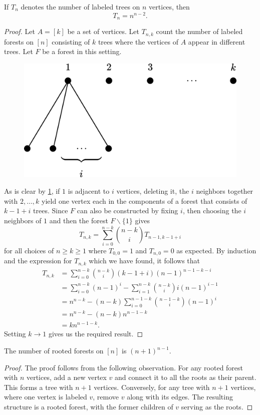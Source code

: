 \begin{theorem}
If $T_n$ denotes the number of labeled trees on $n$ vertices, then
    \[
    T_n = n^{n-2}.
    \]
    \label{t:Cayley's Formula}
\end{theorem}
\begin{proof}
Let $A=[k]$ be a set of vertices. Let $T_{n,k}$ count the number of labeled forests on $[n]$ consisting of $k$ trees where the vertices of $A$ appear in different trees. Let $F$ be a forest in this setting.
\begin{figure}[H]
    \centering
    \includegraphics[width=0.5\linewidth]{Images/Figure30.png}
    \caption{}
    \label{f:CTProof}
\end{figure}
As is clear by \cref{f:CTProof}, if $1$ is adjacent to $i$ vertices, deleting it, the $i$ neighbors together with $2,\ldots,k$ yield one vertex each in the components of a forest that consists of $k-1+i$ trees. Since $F$ can also be constructed by fixing $i$, then choosing the $i$ neighbors of $1$ and then the forest $F\backslash \{1\}$ gives \[
T_{n,k} = \sum_{i=0}^{n-k}\binom{n-k}{i}T_{n-1,k-1+i}
\]
for all choices of $n\geq k\geq 1$ where $T_{0,0}=1$ and $T_{n,0}=0$ as expected. By induction and the expression for $T_{n,k}$ which we have found, it follows that
\begin{align*}
    T_{n,k}&= \sum_{i=0}^{n-k}\binom{n-k}{i}(k-1+i)(n-1)^{n-1-k-i} \\
    &= \sum_{i=0}^{n-k}(n-1)^i-\sum_{i=1}^{n-k}\binom{n-k}{i}i(n-1)^{i-1} \\
    &= n^{n-k}-(n-k)\sum_{i=0}^{n-1-k}\binom{n-1-k}{i}(n-1)^i \\
    &= n^{n-k}-(n-k)n^{n-1-k} \\
    &= kn^{n-1-k}.
\end{align*}
Setting $k\to 1$ gives us the required result.
\end{proof}
\begin{theorem}
The number of rooted forests on $[n]$ is $(n+1)^{n-1}$.
\end{theorem}
\begin{proof}
The proof follows from the following observation. For any rooted forest with \( n \) vertices, add a new vertex \( v \) and connect it to all the roots as their parent. This forms a tree with \( n + 1 \) vertices. Conversely, for any tree with \( n + 1 \) vertices, where one vertex is labeled \( v \), remove \( v \) along with its edges. The resulting structure is a rooted forest, with the former children of \( v \) serving as the roots.
\end{proof}
